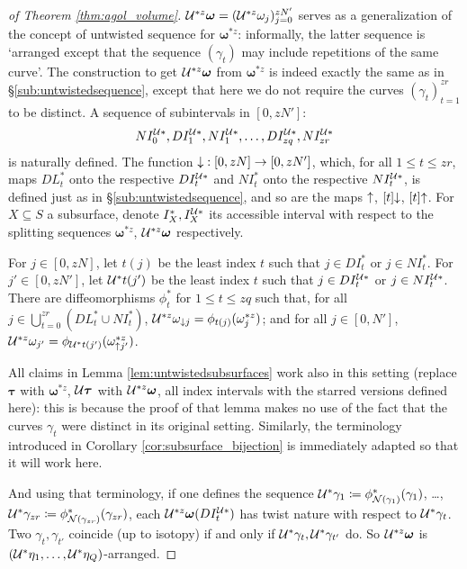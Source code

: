 \begin{proof}[of Theorem \ref{thm:agol_volume}]
${\mathcal U}^{*z}\bm\omega=({\mathcal U}^{*z}\omega_j)_{j=0}^{zN'}$ serves as a generalization of the concept of untwisted sequence for $\bm\omega^{*z}$: informally, the latter sequence is `arranged except that the sequence $(\gamma_t)$ may include repetitions of the same curve'. The construction to get ${\mathcal U}^{*z}\bm\omega$ from $\bm\omega^{*z}$ is indeed exactly the same as in \S \ref{sub:untwistedsequence}, except that here we do not require the curves $(\gamma_t)_{t=1}^{zr}$ to be distinct. A sequence of subintervals in $[0, zN']$:
$$NI^{{\mathcal U}*}_0,DI^{{\mathcal U}*}_1,NI^{{\mathcal U}*}_1,\ldots, DI^{{\mathcal U}*}_{zq}, NI^{{\mathcal U}*}_{zr}$$
is naturally defined. The function $\mathord{\downarrow}:[0,zN]\rightarrow [0,zN']$, which, for all $1\leq t \leq zr$, maps $DL^*_t$ onto the respective $DI^{{\mathcal U}*}_t$ and $NI^*_t$ onto the respective $NI^{{\mathcal U}*}_t$, is defined just as in \S \ref{sub:untwistedsequence}, and so are the maps $\mathord{\uparrow}$, $[t]\mathord{\downarrow}$, $[t]\mathord{\uparrow}$. For $X\subseteq S$ a subsurface, denote $I^*_X, I^{{\mathcal U} *}_X$ its accessible interval with respect to the splitting sequences $\bm\omega^{*z}$, ${\mathcal U}^{*z}\bm\omega$ respectively.

For $j\in [0,zN]$, let $t(j)$ be the least index $t$ such that $j\in DI^*_t$ or $j\in NI^*_t$. For $j'\in [0,zN']$, let ${\mathcal U}^* t(j')$ be the least index $t$ such that $j\in DI_t^{{\mathcal U} *}$ or $j\in NI_t^{{\mathcal U} *}$. There are diffeomorphisms $\phi^*_t$ for $1\leq t\leq zq$ such that, for all $j\in \bigcup_{t=0}^{zr} (DL^*_t\cup NI^*_t)$, ${\mathcal U}^{*z}\omega_{\mathord{\downarrow} j}=\phi_{t(j)}(\omega^{*z}_j)$; and for all $j\in[0,N']$, ${\mathcal U}^{*z}\omega_{j'}=\phi_{{\mathcal U}^* t(j')}(\omega^{*z}_{\mathord{\uparrow} j'})$. 

All claims in Lemma \ref{lem:untwistedsubsurfaces} work also in this setting (replace $\bm\tau$ with $\bm\omega^{*z}$, ${\mathcal U}\bm\tau$ with ${\mathcal U}^{*z}\bm\omega$, all index intervals with the starred versions defined here): this is because the proof of that lemma makes no use of the fact that the curves $\gamma_t$ were distinct in its original setting. Similarly, the terminology introduced in Corollary \ref{cor:subsurface_bijection} is immediately adapted so that it will work here.

And using that terminology, if one defines the sequence ${\mathcal U}^*\gamma_1\coloneqq \phi^*_{{\mathcal N}(\gamma_1)}(\gamma_1)$, \ldots, ${\mathcal U}^*\gamma_{zr}\coloneqq \phi^*_{{\mathcal N}(\gamma_{zr})}(\gamma_{zr})$, each ${\mathcal U}^{*z}\bm\omega(DI^{{\mathcal U}*}_t)$ has twist nature with respect to ${\mathcal U}^*\gamma_t$. Two $\gamma_t,\gamma_{t'}$ coincide (up to isotopy) if and only if ${\mathcal U}^*\gamma_t,{\mathcal U}^*\gamma_{t'}$ do. So ${\mathcal U}^{*z}\bm\omega$ is $({\mathcal U}^*\eta_1,\ldots,{\mathcal U}^*\eta_Q)$-arranged.


\end{proof}
